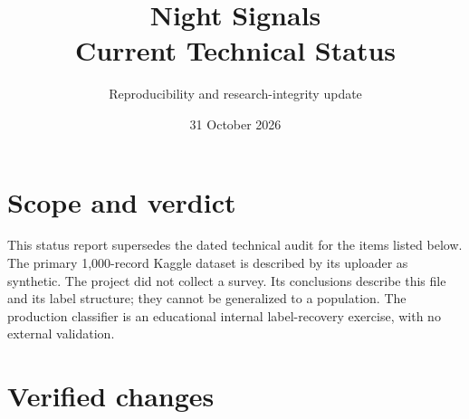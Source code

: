 \documentclass[10pt,a4paper]{article}
\title{Night Signals\\Current Technical Status}
\author{Reproducibility and research-integrity update}
\date{31 October 2026}
\begin{document}
\maketitle
\section*{Scope and verdict}
This status report supersedes the dated technical audit for the items listed below. The primary 1,000-record Kaggle dataset is described by its uploader as synthetic. The project did not collect a survey. Its conclusions describe this file and its label structure; they cannot be generalized to a population. The production classifier is an educational internal label-recovery exercise, with no external validation.

\section*{Verified changes}
\end{document}
